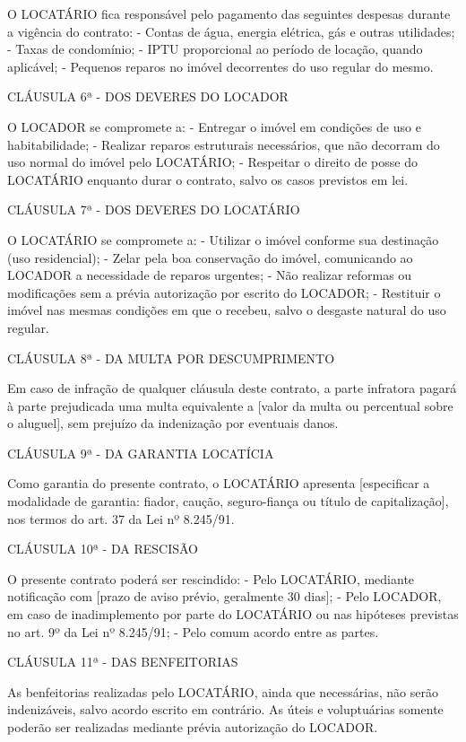 \begin{anexosenv}
O LOCATÁRIO fica responsável pelo pagamento das seguintes despesas durante a vigência do contrato:
- Contas de água, energia elétrica, gás e outras utilidades;
- Taxas de condomínio;
- IPTU proporcional ao período de locação, quando aplicável;
- Pequenos reparos no imóvel decorrentes do uso regular do mesmo.

CLÁUSULA 6ª - DOS DEVERES DO LOCADOR

O LOCADOR se compromete a:
- Entregar o imóvel em condições de uso e habitabilidade;
- Realizar reparos estruturais necessários, que não decorram do uso normal do imóvel pelo LOCATÁRIO;
- Respeitar o direito de posse do LOCATÁRIO enquanto durar o contrato, salvo os casos previstos em lei.

CLÁUSULA 7ª - DOS DEVERES DO LOCATÁRIO

O LOCATÁRIO se compromete a:
- Utilizar o imóvel conforme sua destinação (uso residencial);
- Zelar pela boa conservação do imóvel, comunicando ao LOCADOR a necessidade de reparos urgentes;
- Não realizar reformas ou modificações sem a prévia autorização por escrito do LOCADOR;
- Restituir o imóvel nas mesmas condições em que o recebeu, salvo o desgaste natural do uso regular.

CLÁUSULA 8ª - DA MULTA POR DESCUMPRIMENTO

Em caso de infração de qualquer cláusula deste contrato, a parte infratora pagará à parte prejudicada uma multa equivalente a [valor da multa ou percentual sobre o aluguel], sem prejuízo da indenização por eventuais danos.

CLÁUSULA 9ª - DA GARANTIA LOCATÍCIA

Como garantia do presente contrato, o LOCATÁRIO apresenta [especificar a modalidade de garantia: fiador, caução, seguro-fiança ou título de capitalização], nos termos do art. 37 da Lei nº 8.245/91.

CLÁUSULA 10ª - DA RESCISÃO

O presente contrato poderá ser rescindido:
- Pelo LOCATÁRIO, mediante notificação com [prazo de aviso prévio, geralmente 30 dias];
- Pelo LOCADOR, em caso de inadimplemento por parte do LOCATÁRIO ou nas hipóteses previstas no art. 9º da Lei nº 8.245/91;
- Pelo comum acordo entre as partes.

CLÁUSULA 11ª - DAS BENFEITORIAS

As benfeitorias realizadas pelo LOCATÁRIO, ainda que necessárias, não serão indenizáveis, salvo acordo escrito em contrário. As úteis e voluptuárias somente poderão ser realizadas mediante prévia autorização do LOCADOR.


\end{anexosenv}
